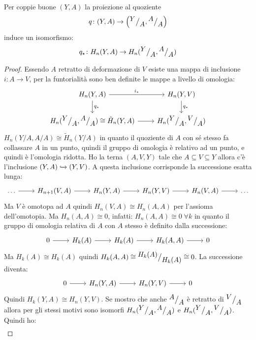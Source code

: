 \begin{lemma}
  Per coppie buone $ (Y,A) $ la proiezione al quoziente
  \[
    q \colon (Y,A) \to \left({^{\textstyle Y}\big/_{\textstyle A}}, {^{\textstyle A}\big/_{\textstyle A}} \right)
  \]
  induce un isomorfismo:
  \[
    q_\star \colon H_n(Y,A) \to  H_n({^{\textstyle Y}\big/_{\textstyle A}}, {^{\textstyle A}\big/_{\textstyle A}})
  \]
\end{lemma}
\begin{proof}
  Essendo $ A $ retratto di deformazione di $ V $ esiste
  una mappa di inclusione $ i \colon A \to V $, per la funtorialità
  sono ben definite le mappe a livello di omologia:
  \[
    \begin{tikzcd}
      H_n(Y,A) \rar{i_\star} \dar{q_\star} & H_n(Y,V) \dar{q_\star} \\
      H_n(\quot{Y}{A}, \quot{A}{A}) \cong \tilde{H}_n(Y,A) \rar & H_n(\quot{Y}{A}, \quot{V}{A})
    \end{tikzcd}
  \]
  $  H_n({Y} \slash {A}, {A} \slash {A}) \cong \tilde{H}_n({Y} \slash {A}) $ in quanto il quoziente
  di $ A $ con sé stesso fa collassare $ A $ in un punto, quindi il gruppo di omologia
  è relativo ad un punto, e quindi è l'omologia ridotta.
  Ho la terna $ (A, V, Y) $ tale che $ A \subseteq V \subseteq Y $ allora c'è l'inclusione
  $ (Y,A) \xhookrightarrow{} (Y,V) $. A questa inclusione corrisponde la successione esatta lunga:
  \[
    \begin{tikzcd}
      \dots \rar & H_{n+1}(V, A) \rar & H_n(Y, A) \rar & H_n(Y,V) \rar & H_{n}(V,A) \rar & \dots
    \end{tikzcd}
  \]
  Ma $ V $ è omotopa ad $ A $ quindi $ H_n(V,A) \cong H_n(A,A) $ per l'assioma dell'omotopia.
  Ma $ H_n(A,A) \cong 0 $, infatti:
  $ H_n(A,A) \cong 0 \; \forall k $ in quanto il gruppo di omologia relativa
  di $ A $ con $ A $ stesso è definito dalla successione:
  \[
    \begin{tikzcd}
      0 \rar   & H_k(A) \rar  & H_k(A) \rar  & H_k(A,A) \rar & 0
    \end{tikzcd}
  \]
  Ma $ H_k(A) \cong H_k(A) $ quindi  $ H_k(A,A) \cong {^{\textstyle H_k(A)}\big/_{\textstyle H_k(A)}} \cong 0 $.
  La successione diventa:
  \[
    \begin{tikzcd}
      0 \rar & H_n(Y, A) \rar & H_n(Y,V) \rar & 0
    \end{tikzcd}
  \]
  Quindi $ H_k(Y,A) \cong H_n(Y,V) $.
  Se mostro che anche $ {^{\textstyle A}\big/_{\textstyle A}} $ è retratto di $ {^{\textstyle V}\big/_{\textstyle A}} $
  allora per  gli stessi motivi sono isomorfi
  $ H_n({^{\textstyle Y}\big/_{\textstyle A}}, {^{\textstyle A}\big/_{\textstyle A}}) $ e $ H_n({^{\textstyle Y}\big/_{\textstyle A}}, {^{\textstyle V}\big/_{\textstyle A}}) $.
  Quindi ho:
  \begin{align*}

\end{align*}
\end{proof}
